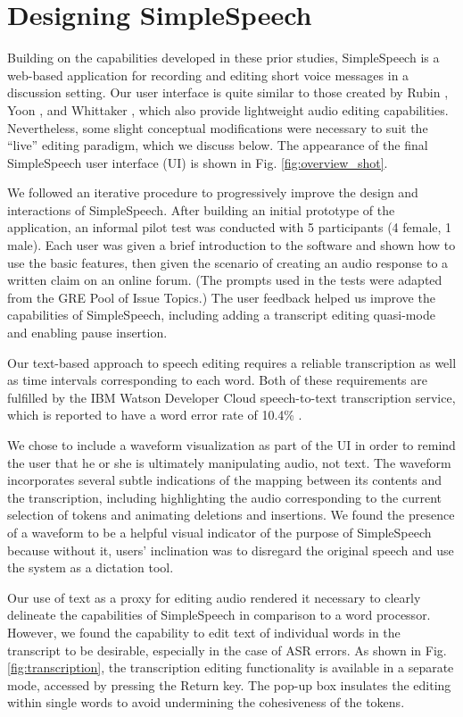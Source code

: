 \section{Designing SimpleSpeech}
Building on the capabilities developed in these prior studies, SimpleSpeech is a web-based application for recording and editing short voice messages in a discussion setting.
Our user interface is quite similar to those created by Rubin \cite{rubin}, Yoon \cite{yoon}, and Whittaker \cite{whittaker_semantic}, which also provide lightweight audio editing capabilities.
Nevertheless, some slight conceptual modifications were necessary to suit the ``live'' editing paradigm, which we discuss below.
The appearance of the final SimpleSpeech user interface (UI) is shown in Fig. \ref{fig:overview_shot}.

We followed an iterative procedure to progressively improve the design and interactions of SimpleSpeech.
After building an initial prototype of the application, an informal pilot test was conducted with 5 participants (4 female, 1 male). 
Each user was given a brief introduction to the software and shown how to use the basic features, then given the scenario of creating an audio response to a written claim on an online forum. 
(The prompts used in the tests were adapted from the GRE Pool of Issue Topics.)
The user feedback helped us improve the capabilities of SimpleSpeech, including adding a transcript editing quasi-mode and enabling pause insertion.

Our text-based approach to speech editing requires a reliable transcription as well as time intervals corresponding to each word.
Both of these requirements are fulfilled by the IBM Watson Developer Cloud speech-to-text transcription service, which is reported to have a word error rate of 10.4\% \cite{soltau:2014}.

We chose to include a waveform visualization as part of the UI in order to remind the user that he or she is ultimately manipulating audio, not text. 
The waveform incorporates several subtle indications of the mapping between its contents and the transcription, including highlighting the audio corresponding to the current selection of tokens and animating deletions and insertions.
We found the presence of a waveform to be a helpful visual indicator of the purpose of SimpleSpeech because without it, users' inclination was to disregard the original speech and use the system as a dictation tool.

Our use of text as a proxy for editing audio rendered it necessary to clearly delineate the capabilities of SimpleSpeech in comparison to a word processor.
However, we found the capability to edit text of individual words in the transcript to be desirable, especially in the case of ASR errors.
As shown in Fig. \ref{fig:transcription}, the transcription editing functionality is available in a separate mode, accessed by pressing the Return key.
The pop-up box insulates the editing within single words to avoid undermining the cohesiveness of the tokens. 

